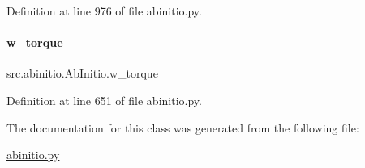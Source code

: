 Definition at line 976 of file abinitio.\+py.

\mbox{\label{classsrc_1_1abinitio_1_1AbInitio_a6a0e3f7148aa806e02f51078ff53076f}} 
\paragraph{\texorpdfstring{w\+\_\+torque}{w\_torque}}
{\footnotesize\ttfamily src.\+abinitio.\+Ab\+Initio.\+w\+\_\+torque}



Definition at line 651 of file abinitio.\+py.



The documentation for this class was generated from the following file\+:\begin{DoxyCompactItemize}
\item 
\hyperlink{abinitio_8py}{abinitio.\+py}\end{DoxyCompactItemize}
